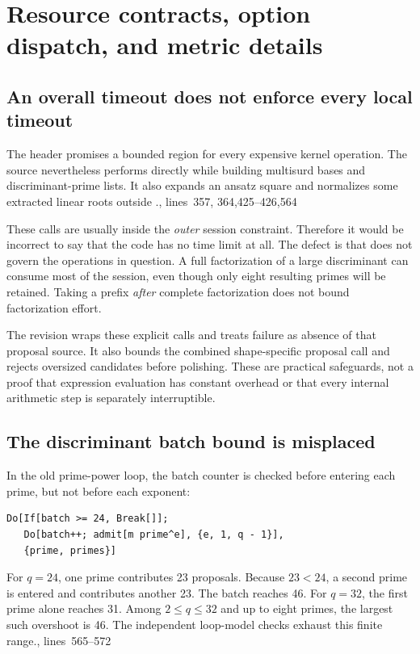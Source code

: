 \documentclass[11pt,a4paper]{article}
\newcommand{\code}[1]{\texttt{\detokenize{#1}}}
\newcommand{\src}[1]{\cite{source}, lines~#1}
\theoremstyle{definition}\newtheorem{definition}[proposition]{Definition}
\theoremstyle{remark}\newtheorem{remark}[proposition]{Remark}
\begin{document}
\section{Resource contracts, option dispatch, and metric details}

\subsection{An overall timeout does not enforce every local timeout}
The header promises a bounded region for every expensive kernel operation.
The source nevertheless performs \code{FactorInteger} directly while building
multisurd bases and discriminant-prime lists. It also expands an ansatz square
and normalizes some extracted linear roots outside \code{bounded}.\src{357,
364,425--426,564}

These calls are usually inside the \emph{outer} session constraint. Therefore
it would be incorrect to say that the code has no time limit at all. The defect
is that \code{"OperationTime"} does not govern the operations in question.
A full factorization of a large discriminant can consume most of the session,
even though only eight resulting primes will be retained. Taking a prefix
\emph{after} complete factorization does not bound factorization effort.

The revision wraps these explicit calls and treats failure as absence of that
proposal source. It also bounds the combined shape-specific proposal call and
rejects oversized candidates before polishing. These are practical safeguards,
not a proof that expression evaluation has constant overhead or that every
internal arithmetic step is separately interruptible.

\subsection{The discriminant batch bound is misplaced}
In the old prime-power loop, the batch counter is checked before entering each
prime, but not before each exponent:
\begin{lstlisting}
Do[If[batch >= 24, Break[]];
   Do[batch++; admit[m prime^e], {e, 1, q - 1}],
   {prime, primes}]
\end{lstlisting}
For $q=24$, one prime contributes 23 proposals. Because $23<24$, a second prime
is entered and contributes another 23. The batch reaches 46. For $q=32$, the
first prime alone reaches 31. Among $2\le q\le32$ and up to eight primes, the
largest such overshoot is 46. The independent loop-model checks exhaust this
finite range.\src{565--572}
\end{document}
